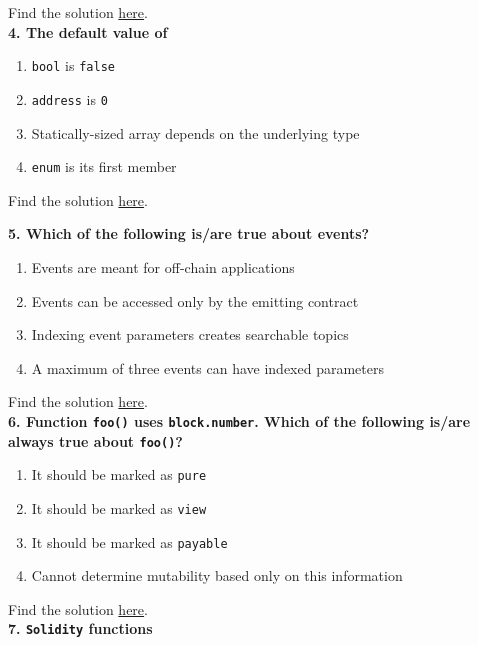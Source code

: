 Find the solution \hyperref[sec:exam2_q3]{here}.\\

\textbf{4. The default value of}

\begin{enumerate}[label=\Alph*.]
    \item \verb|bool| is \verb|false|
    \item \verb|address| is \verb|0|
    \item Statically-sized array depends on the underlying type
    \item\verb|enum| is its first member
\end{enumerate}

Find the solution \hyperref[sec:exam2_q4]{here}.\\

\pagebreak

\textbf{5. Which of the following is/are true about events?}

\begin{enumerate}[label=\Alph*.]
    \item Events are meant for off-chain applications
    \item Events can be accessed only by the emitting contract
    \item Indexing event parameters creates searchable topics
    \item A maximum of three events can have indexed parameters
\end{enumerate}

Find the solution \hyperref[sec:exam2_q5]{here}.\\

\textbf{6. Function \texttt{foo()} uses \texttt{block.number}. Which of the following is/are always true about \texttt{foo()}?}

\begin{enumerate}[label=\Alph*.]
    \item It should be marked as \verb|pure|
    \item It should be marked as \verb|view|
    \item It should be marked as \verb|payable|
    \item Cannot determine mutability based only on this information
\end{enumerate}

Find the solution \hyperref[sec:exam2_q6]{here}.\\

\textbf{7. \texttt{Solidity} functions}

